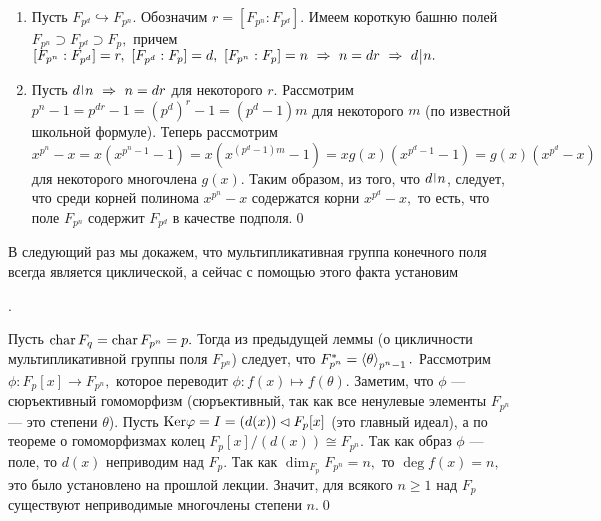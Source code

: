
\dok \begin{enumerate}
    \item Пусть $F_{p^d}\hookrightarrow F_{p^n}.$ Обозначим $r=[F_{p^n}:F_{p^d}]$. Имеем короткую башню полей $F_{p^n}\supset F_{p^d}\supset F_{p},$ причем
    $[F_{p^n}:F_{p^d}]=r,\ [F_{p^d}:F_{p}]=d,\ [F_{p^n}:F_{p}]=n\ra n=dr\ra d\,\vrule\, n.$
    \item Пусть $d\,\vrule\,n\ra n=dr$ для некоторого $r$. Рассмотрим $p^n-1=p^{dr}-1=(p^d)^r-1=(p^d-1)m$ для некоторого $m$ (по известной школьной формуле).
    Теперь рассмотрим
    $$
    x^{p^n}-x=x\left(x^{p^n-1}-1\right)=x\left(x^{(p^d-1)m}-1\right)=xg(x)\left(x^{p^d-1}-1\right)=g(x)\left(x^{p^d}-x\right)
    $$
    для некоторого многочлена $g(x).$ Таким образом, из того, что $d\,\vrule\,n$, следует, что среди корней полинома $x^{p^n}-x$ содержатся корни $x^{p^d}-x,$ то есть, что
    поле $F_{p^n}$ содержит $F_{p^d}$ в качестве подполя.\qquad\qed
\end{enumerate}

В следующий раз мы докажем, что мультипликативная группа конечного поля всегда является циклической, а сейчас с помощью этого факта  установим

.

\dok Пусть ${\rm char\,}F_q={\rm char\,}F_{p^n}=p.$ Тогда из предыдущей леммы (о цикличности мультипликативной группы поля $F_{p^n}$) следует, что $F_{p^n}^*=\left\langle\theta\right\rangle_{p^n-1}.$
Рассмотрим $\phi : F_p[x]\rightarrow F_{p^n},$ которое переводит $\phi : f(x)\mapsto f(\theta).$ Заметим, что $\phi$ --- сюръективный гомоморфизм (сюръективный, так как все ненулевые элементы $F_{p^n}$ --- это
степени $\theta$). Пусть ${\rm Ker}\varphi=I=(d(x))\lhd F_p[x]$ (это главный идеал), а по теореме о гомоморфизмах колец $F_{p}[x]/(d(x))\cong F_{p^n}.$
Так как образ $\phi$ --- поле, то $d(x)$ неприводим над $F_p$. Так как $\dim_{F_p}F_{p^n}=n,$ то $\deg f(x)=n,$ это было установлено на прошлой лекции.
Значит, для всякого $n\ge 1$ над $F_p$ существуют неприводимые многочлены степени $n$.\qquad\qed
